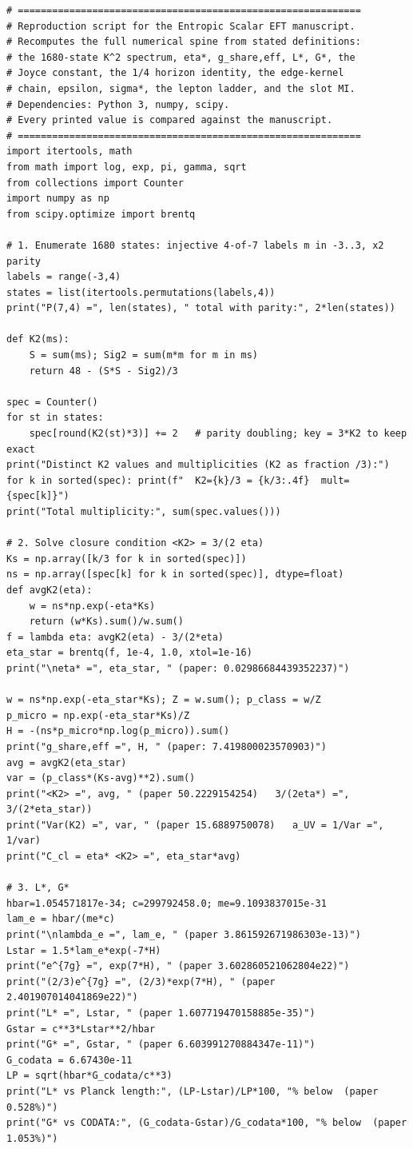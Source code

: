 \documentclass[11pt]{article}
\begin{document}
{\footnotesize\begin{verbatim}
# ============================================================
# Reproduction script for the Entropic Scalar EFT manuscript.
# Recomputes the full numerical spine from stated definitions:
# the 1680-state K^2 spectrum, eta*, g_share,eff, L*, G*, the
# Joyce constant, the 1/4 horizon identity, the edge-kernel
# chain, epsilon, sigma*, the lepton ladder, and the slot MI.
# Dependencies: Python 3, numpy, scipy.
# Every printed value is compared against the manuscript.
# ============================================================
import itertools, math
from math import log, exp, pi, gamma, sqrt
from collections import Counter
import numpy as np
from scipy.optimize import brentq

# 1. Enumerate 1680 states: injective 4-of-7 labels m in -3..3, x2 parity
labels = range(-3,4)
states = list(itertools.permutations(labels,4))
print("P(7,4) =", len(states), " total with parity:", 2*len(states))

def K2(ms):
    S = sum(ms); Sig2 = sum(m*m for m in ms)
    return 48 - (S*S - Sig2)/3

spec = Counter()
for st in states:
    spec[round(K2(st)*3)] += 2   # parity doubling; key = 3*K2 to keep exact
print("Distinct K2 values and multiplicities (K2 as fraction /3):")
for k in sorted(spec): print(f"  K2={k}/3 = {k/3:.4f}  mult={spec[k]}")
print("Total multiplicity:", sum(spec.values()))

# 2. Solve closure condition <K2> = 3/(2 eta)
Ks = np.array([k/3 for k in sorted(spec)])
ns = np.array([spec[k] for k in sorted(spec)], dtype=float)
def avgK2(eta):
    w = ns*np.exp(-eta*Ks)
    return (w*Ks).sum()/w.sum()
f = lambda eta: avgK2(eta) - 3/(2*eta)
eta_star = brentq(f, 1e-4, 1.0, xtol=1e-16)
print("\neta* =", eta_star, " (paper: 0.02986684439352237)")

w = ns*np.exp(-eta_star*Ks); Z = w.sum(); p_class = w/Z
p_micro = np.exp(-eta_star*Ks)/Z
H = -(ns*p_micro*np.log(p_micro)).sum()
print("g_share,eff =", H, " (paper: 7.419800023570903)")
avg = avgK2(eta_star)
var = (p_class*(Ks-avg)**2).sum()
print("<K2> =", avg, " (paper 50.2229154254)   3/(2eta*) =", 3/(2*eta_star))
print("Var(K2) =", var, " (paper 15.6889750078)   a_UV = 1/Var =", 1/var)
print("C_cl = eta* <K2> =", eta_star*avg)

# 3. L*, G*
hbar=1.054571817e-34; c=299792458.0; me=9.1093837015e-31
lam_e = hbar/(me*c)
print("\nlambda_e =", lam_e, " (paper 3.861592671986303e-13)")
Lstar = 1.5*lam_e*exp(-7*H)
print("e^{7g} =", exp(7*H), " (paper 3.602860521062804e22)")
print("(2/3)e^{7g} =", (2/3)*exp(7*H), " (paper 2.401907014041869e22)")
print("L* =", Lstar, " (paper 1.607719470158885e-35)")
Gstar = c**3*Lstar**2/hbar
print("G* =", Gstar, " (paper 6.603991270884347e-11)")
G_codata = 6.67430e-11
LP = sqrt(hbar*G_codata/c**3)
print("L* vs Planck length:", (LP-Lstar)/LP*100, "% below  (paper 0.528%)")
print("G* vs CODATA:", (G_codata-Gstar)/G_codata*100, "% below  (paper 1.053%)")


\end{verbatim}}
\end{document}
